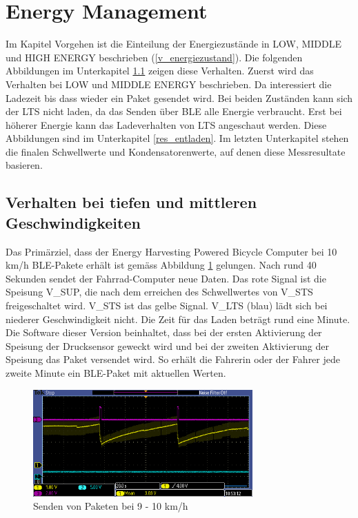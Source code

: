 \section{Energy Management}

Im Kapitel Vorgehen ist die Einteilung der Energiezustände in LOW, MIDDLE und HIGH ENERGY beschrieben (\ref{v_energiezustand}). Die folgenden Abbildungen im Unterkapitel \ref{tiefes_v} zeigen diese Verhalten. Zuerst wird das Verhalten bei LOW und MIDDLE ENERGY beschrieben. Da interessiert die Ladezeit bis dass wieder ein Paket gesendet wird. Bei beiden Zuständen kann sich der LTS nicht laden, da das Senden über BLE alle Energie verbraucht. Erst bei höherer Energie kann das Ladeverhalten von LTS angeschaut werden. Diese Abbildungen sind im Unterkapitel \ref{res_entladen}. Im letzten Unterkapitel stehen die finalen Schwellwerte und Kondensatorenwerte, auf denen diese Messresultate basieren.

\subsection{Verhalten bei tiefen und mittleren Geschwindigkeiten}
\label{tiefes_v}


Das Primärziel, dass der Energy Harvesting Powered Bicycle Computer bei 10 km/h BLE-Pakete erhält ist gemäss Abbildung \ref{paket_100kmh} gelungen. Nach rund 40 Sekunden sendet der Fahrrad-Computer neue Daten. Das rote Signal ist die Speisung V\_SUP, die nach dem erreichen des Schwellwertes von V\_STS  freigeschaltet wird. V\_STS ist das gelbe Signal. V\_LTS (blau) lädt sich bei niederer Geschwindigkeit nicht. Die Zeit für das Laden beträgt rund eine Minute. Die Software dieser Version beinhaltet, dass bei der ersten Aktivierung der Speisung der Drucksensor geweckt wird  und bei der zweiten Aktivierung der Speisung das Paket versendet wird. So erhält die Fahrerin oder der Fahrer jede zweite Minute ein BLE-Paket mit aktuellen Werten.\\

\clearpage
\begin{figure}[ht]
   \includegraphics[width=0.75\textwidth]{4Resultate/imag/pic_3.PNG}
    \caption{Senden von Paketen bei 9 - 10 km/h}
    \label{paket_100kmh}
\end{figure}

